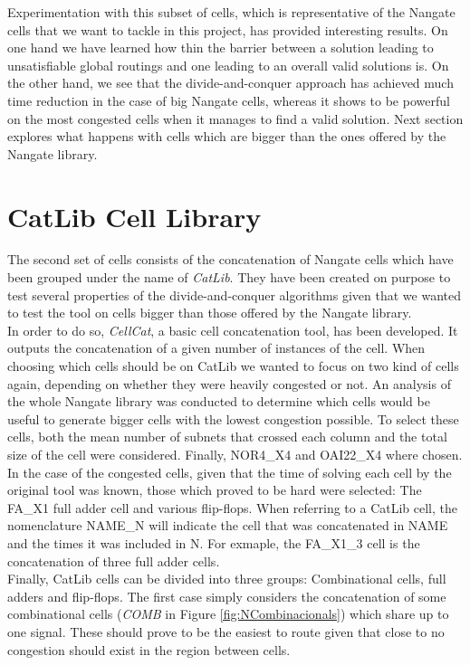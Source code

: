 Experimentation with this subset of cells, which is representative of the Nangate cells that we want to tackle in this project, has provided interesting results. On one hand we have learned how thin the barrier between a solution leading to unsatisfiable global routings and one leading to an overall valid solutions is. On the other hand, we see that the divide-and-conquer approach has achieved much time reduction in the case of big Nangate cells, whereas it shows to be powerful on the most congested cells when it manages to find a valid solution. Next section explores what happens with cells which are bigger than the ones offered by the Nangate library. \\

\section{CatLib Cell Library}

The second set of cells consists of the concatenation of Nangate cells which have been grouped under the name of \textit{CatLib}. They have been created on purpose to test several properties of the divide-and-conquer algorithms given that we wanted to test the tool on cells bigger than those offered by the Nangate library. \\

In order to do so, \textit{CellCat}, a basic cell concatenation tool, has been developed. It outputs the concatenation of a given number of instances of the cell. When choosing which cells should be on CatLib we wanted to focus on two kind of cells again, depending on whether they were heavily congested or not. An analysis of the whole Nangate library was conducted to determine which cells would be useful to generate bigger cells with the lowest congestion possible. To select these cells, both the mean number of subnets that crossed each column and the total size of the cell were considered. Finally, NOR4\_X4 and OAI22\_X4 where chosen. In the case of the congested cells, given that the time of solving each cell by the original tool was known, those which proved to be hard were selected: The FA\_X1 full adder cell and various flip-flops. When referring to a CatLib cell, the nomenclature NAME\_N will indicate the cell that was concatenated in NAME and the times it was included in N. For exmaple, the FA\_X1\_3 cell is the concatenation of three full adder cells. \\

Finally, CatLib cells can be divided into three groups: Combinational cells, full adders and flip-flops. The first case simply considers the concatenation of some combinational cells (\textit{COMB} in Figure \ref{fig:NCombinacionals}) which share up to one signal. These should prove to be the easiest to route given that close to no congestion should exist in the region between cells. \\

